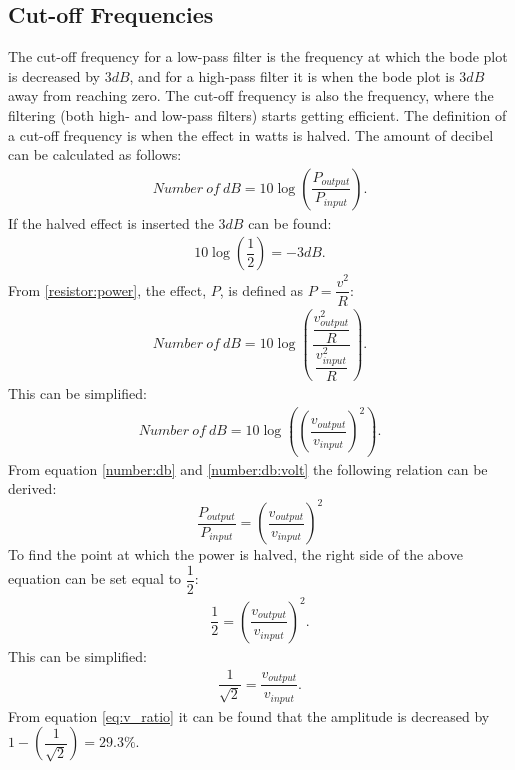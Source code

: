 \subsection{Cut-off Frequencies}
The cut-off frequency for a low-pass filter is the frequency at which the bode plot is decreased by $3dB$, and for a high-pass filter it is when the bode plot is $3dB$ away from reaching zero. The cut-off frequency is also the frequency, where the filtering (both high- and low-pass filters) starts getting efficient. The definition of a cut-off frequency is when the effect in watts is halved. The amount of decibel can be calculated as follows: \cite[p. 596-597]{bcircuit}
\begin{align} \label{number:db}
Number \ of \ dB = 10 \log \left(\dfrac{P_{output}}{P_{input}} \right).
\end{align}
If the halved effect is inserted the $3dB$ can be found:
\begin{align*} 
10 \log \left(\dfrac{1}{2} \right) = -3 dB.
\end{align*}
From \eqref{resistor:power}, the effect, $P$, is defined as $P=\dfrac{v^2}{R}$:
\begin{align*}
Number \ of \ dB = 10 \log \left(\dfrac{\dfrac{v_{output}^2}{R}}{\dfrac{v_{input}^2}{R}} \right).
\end{align*}
This can be simplified:
\begin{align} \label{number:db:volt}
Number \ of \ dB = 10 \log \left(\left(\dfrac{v_{output}}{v_{input}} \right)^2\right).
\end{align}
From equation \eqref{number:db} and \eqref{number:db:volt} the following relation can be derived: $$\dfrac{P_{output}}{P_{input}}= \left(\dfrac{v_{output}}{v_{input}} \right)^2$$ To find the point at which the power is halved, the right side of the above equation can be set equal to $\dfrac{1}{2}$:
\begin{align*}
\dfrac{1}{2}= \left(\dfrac{v_{output}}{v_{input}} \right)^2.
\end{align*}
This can be simplified:
\begin{align} \label{eq:v_ratio}
\dfrac{1}{\sqrt{2}}= \dfrac{v_{output}}{v_{input}}.
\end{align}
From equation \eqref{eq:v_ratio} it can be found that the amplitude is decreased by $1-\left(\dfrac{1}{\sqrt{2}} \right) = 29.3\%$.

